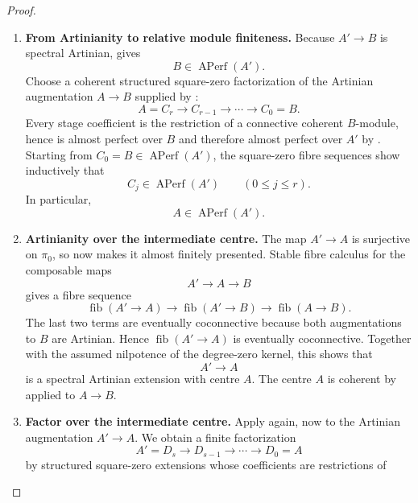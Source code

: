\begin{proof}
\leavevmode
\begin{enumerate}[label=\textup{(\arabic*)}]
    \item \textbf{From Artinianity to relative module finiteness.}
    Because \(A'\to B\) is spectral Artinian,
     gives
    \[
        B\in\operatorname{APerf}(A').
    \]
    Choose a coherent structured square-zero factorization of the
    Artinian augmentation \(A\to B\) supplied by
    :
    \[
        A=C_r\longrightarrow C_{r-1}\longrightarrow\cdots
        \longrightarrow C_0=B.
    \]
    Every stage coefficient is the restriction of a connective coherent
    \(B\)-module, hence is almost perfect over \(B\) and therefore almost perfect
    over \(A'\) by . Starting
    from \(C_0=B\in\operatorname{APerf}(A')\), the square-zero fibre sequences
    show inductively that
    \[
        C_j\in\operatorname{APerf}(A')
        \qquad(0\leq j\leq r).
    \]
    In particular,
    \[
        A\in\operatorname{APerf}(A').
    \]
    \item \textbf{Artinianity over the intermediate centre.}
    The map \(A'\to A\) is surjective on \(\pi_0\), so
     now makes it almost finitely
    presented. Stable fibre calculus for the composable maps
    \[
        A'\longrightarrow A\longrightarrow B
    \]
    gives a fibre sequence
    \[
        \operatorname{fib}(A'\to A)
        \longrightarrow
        \operatorname{fib}(A'\to B)
        \longrightarrow
        \operatorname{fib}(A\to B).
    \]
    The last two terms are eventually coconnective because both augmentations to
    \(B\) are Artinian. Hence \(\operatorname{fib}(A'\to A)\) is eventually
    coconnective. Together with the assumed nilpotence of the degree-zero kernel,
    this shows that
    \[
        A'\longrightarrow A
    \]
    is a spectral Artinian extension with centre \(A\). The centre \(A\) is
    coherent by  applied to
    \(A\to B\).
    \item \textbf{Factor over the intermediate centre.}
    Apply  again, now to the
    Artinian augmentation \(A'\to A\). We obtain a finite
    factorization
    \[
        A'=D_s\longrightarrow D_{s-1}\longrightarrow\cdots
        \longrightarrow D_0=A
    \]
    by structured square-zero extensions whose coefficients are restrictions of

\end{enumerate}
\end{proof}
